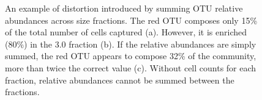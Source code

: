 \begin{figure}
\quad
{}
\caption[Summing relative abundances across size fractions]{An example of distortion introduced by summing OTU relative abundances across size fractions. The red OTU composes only 15\% of the total number of cells captured (a). However, it is enriched (80\%) in the 3.0 \micron{} fraction (b). If the relative abundances are simply summed, the red OTU appears to compose 32\% of the community, more than twice the correct value (c). Without cell counts for each fraction, relative abundances cannot be summed between the fractions.}
\label{fig:fractionabundances}
\end{figure}
